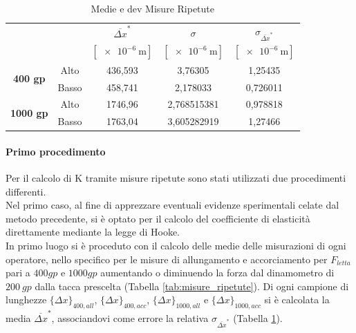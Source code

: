 \documentclass[a4paper,11pt,oneside]{article}
\begin{document}
\begin{table}[h!]
    \centering
    \begin{tabular}{|c|c|c|c|c|}
        \hline
          \multicolumn{2}{|c|}{\multirow{2}{*}{}} & ${\overline{\Delta x}}^\ast$& $\sigma$ & $\sigma_{{\overline{\Delta x}}^\ast}$\\
          \multicolumn{2}{|c|}{} & $[\SI{e-6}{\meter}]$ & $[\SI{e-6}{\meter}]$ & $[\SI{e-6}{\meter}]$\\ 
          \hline
          \multirow{2}{*}{\textbf{400 gp}}& {\cellcolor[rgb]{0.85,0.85,0.85}}Alto & {\cellcolor[rgb]{0.85,0.85,0.85}}436,593&	{\cellcolor[rgb]{0.85,0.85,0.85}}3,76305&	{\cellcolor[rgb]{0.85,0.85,0.85}}1,25435\\ \cline{2-5}
          &Basso&   458,741&	2,178033&	0,726011\\
          \hline
          \multirow{2}{*}{\textbf{1000 gp}}& {\cellcolor[rgb]{0.85,0.85,0.85}}Alto & {\cellcolor[rgb]{0.85,0.85,0.85}}1746,96&	{\cellcolor[rgb]{0.85,0.85,0.85}}2,768515381&	{\cellcolor[rgb]{0.85,0.85,0.85}}0,978818\\ \cline{2-5}
          &Basso&   1763,04&	3,605282919&	1,27466\\
         \hline
    \end{tabular}
    \caption{Medie e dev Misure Ripetute}
    \label{tab:medie_misure_ripetute}
\end{table}{}
\paragraph{Primo procedimento}
Per il calcolo di K tramite misure ripetute sono stati utilizzati due procedimenti differenti.\\
Nel primo caso, al fine di apprezzare eventuali evidenze sperimentali celate dal metodo precedente, si è optato per il calcolo del coefficiente di elasticità direttamente mediante la legge di Hooke.\\%

In primo luogo si è proceduto con il calcolo delle medie delle misurazioni di ogni operatore, nello specifico per le misure di allungamento e accorciamento per $F_{letta}$ pari a $\SI{400}gp$ e $\SI{1000}gp$ aumentando o diminuendo la forza dal dinamometro di $\SI{200}{gp}$ dalla tacca prescelta (Tabella \ref{tab:misure_ripetute}). Di ogni campione di lunghezze $\{ {\Delta x} \}_{400, all}$, $\{ {\Delta x} \}_{400, acc}$, $\{ {\Delta x} \}_{1000, all}$ e $\{ {\Delta x} \}_{1000, acc}$ si è calcolata la media ${\overline{\Delta x}}^\ast$, associandovi come errore la relativa $\sigma_{\overline{\Delta x}^\ast}$ (Tabella \ref{tab:medie_misure_ripetute}).\\
\end{document}
